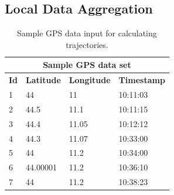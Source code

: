 \subsection{Local Data Aggregation}\label{local-data-aggregation}

\begin{table}[]
  \centering
  \begin{tabular}{|l|l|l|l|}
    \hline
    \multicolumn{4}{|c|}{\textbf{Sample GPS data set}}           \\ \hline
    \textbf{Id} & \textbf{Latitude} & \textbf{Longitude} & \textbf{Timestamp} \\ \hline
    1 & 44              & 11         & 10:11:03    \\ \hline
    2 & 44.5            & 11.1       & 10:11:15    \\ \hline
    3 & 44.4            & 11.05      & 10:12:12    \\ \hline
    4 & 44.3            & 11.07      & 10:33:00    \\ \hline
    5 & 44              & 11.2       & 10:34:00    \\ \hline
    6 & 44.00001        & 11.2       & 10:36:10    \\ \hline
    7 & 44              & 11.2       & 10:38:23    \\ \hline
  \end{tabular}
    \caption{Sample GPS data input for calculating trajectories.}
  \label{algo-input}
\end{table}


